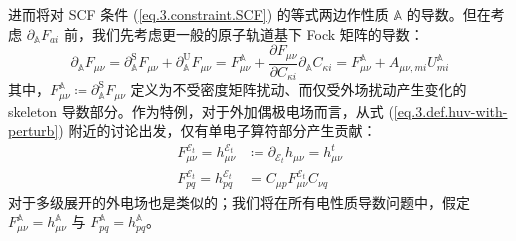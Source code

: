 进而将对 SCF 条件 (\ref{eq.3.constraint.SCF}) 的等式两边作性质 $\mathbb{A}$ 的导数。但在考虑 $\partial_\mathbb{A} F_{ai}$ 前，我们先考虑更一般的原子轨道基下 Fock 矩阵的导数：
\begin{equation}
    \label{eq.3.deduct.pd-Fuv}
    \partial_\mathbb{A} F_{\mu \nu} = \partial_\mathbb{A}^\mathrm{S} F_{\mu \nu} + \partial_\mathbb{A}^\mathrm{U} F_{\mu \nu}
    = F_{\mu \nu}^\mathbb{A} + \frac{\partial F_{\mu \nu}}{\partial C_{\kappa i}} \partial_\mathbb{A} C_{\kappa i}= F_{\mu \nu}^\mathbb{A} + A_{\mu \nu, mi} U_{mi}^\mathbb{A}
\end{equation}
其中，$F_{\mu \nu}^\mathbb{A} \coloneq \partial_\mathbb{A}^\mathrm{S} F_{\mu \nu}$ 定义为不受密度矩阵扰动、而仅受外场扰动产生变化的 skeleton 导数部分。作为特例，对于外加偶极电场而言，从式 (\ref{eq.3.def.huv-with-perturb}) 附近的讨论出发，仅有单电子算符部分产生贡献：
\begin{align}
    \label{eq.3.def.sleketon-huv}
    F_{\mu \nu}^{\mathcal{E}_t} = h_{\mu \nu}^{\mathcal{E}_t} &\coloneq \partial_{\mathcal{E}_t} h_{\mu \nu} = h_{\mu \nu}^t \\
    F_{pq}^{\mathcal{E}_t} = h_{pq}^{\mathcal{E}_t} &= C_{\mu p} F_{\mu \nu}^{\mathcal{E}_t} C_{\nu q}
\end{align}
对于多级展开的外电场也是类似的；我们将在所有电性质导数问题中，假定 $F_{\mu \nu}^\mathbb{A} = h_{\mu \nu}^\mathbb{A}$ 与 $F_{pq}^\mathbb{A} = h_{pq}^\mathbb{A}$。

